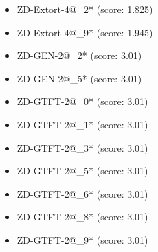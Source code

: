 \begin{appendices}
\begin{itemize}
\begin{multicols}{3}
\begin{itemize}
            \item ZD-Extort-4@\_2* (score: 1.825)
            \item ZD-Extort-4@\_9* (score: 1.945)
            \item ZD-GEN-2@\_2* (score: 3.01)
            \item ZD-GEN-2@\_5* (score: 3.01)
            \item ZD-GTFT-2@\_0* (score: 3.01)
            \item ZD-GTFT-2@\_1* (score: 3.01)
            \item ZD-GTFT-2@\_3* (score: 3.01)
            \item ZD-GTFT-2@\_5* (score: 3.01)
            \item ZD-GTFT-2@\_6* (score: 3.01)
            \item ZD-GTFT-2@\_8* (score: 3.01)
            \item ZD-GTFT-2@\_9* (score: 3.01)
        \end{itemize}
     \end{multicols}
     

\end{itemize}
\end{appendices}
